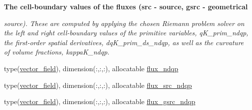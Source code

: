 \begin{Indent}\textbf{ The cell-\/boundary values of the fluxes (src -\/ source, gsrc -\/ geometrical}\par
{\em source). These are computed by applying the chosen Riemann problem solver on the left and right cell-\/boundary values of the primitive variables, q\+K\+\_\+prim\+\_\+ndqp, the first-\/order spatial derivatives, dq\+K\+\_\+prim\+\_\+ds\+\_\+ndqp, as well as the curvature of volume fractions, kappa\+K\+\_\+ndqp. }\begin{DoxyCompactItemize}
\item 
type(\hyperlink{structm__derived__types_1_1vector__field}{vector\+\_\+field}), dimension(\+:,\+:,\+:), allocatable \hyperlink{namespacem__rhs_a10d1ea6f5c8a0d7137be28b1e8c4780f}{flux\+\_\+ndqp}
\item 
type(\hyperlink{structm__derived__types_1_1vector__field}{vector\+\_\+field}), dimension(\+:,\+:,\+:), allocatable \hyperlink{namespacem__rhs_aec977e848537c8ecd3317aefd2bd8607}{flux\+\_\+src\+\_\+ndqp}
\item 
type(\hyperlink{structm__derived__types_1_1vector__field}{vector\+\_\+field}), dimension(\+:,\+:,\+:), allocatable \hyperlink{namespacem__rhs_a5542f5954178123cbe052df43d09dc38}{flux\+\_\+gsrc\+\_\+ndqp}
\end{DoxyCompactItemize}
\end{Indent}
